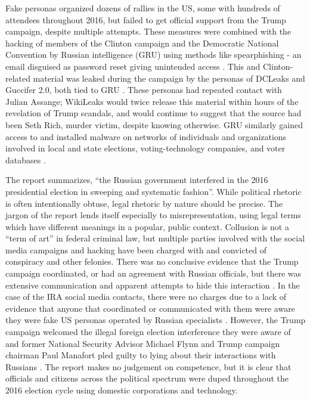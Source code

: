 Fake personas organized dozens of rallies in the US, some with hundreds of attendees throughout 2016, but failed to get official support from the Trump campaign, despite multiple attempts.
These measures were combined with the hacking of members of the Clinton campaign and the Democratic National Convention by Russian intelligence (GRU) using methods like spearphishing - an email disguised as password reset giving unintended access \cite[p.29-37]{mueller}.
This and Clinton-related material was leaked during the campaign by the personas of DCLeaks and Guccifer 2.0, both tied to GRU \cite[p.41]{mueller}.
These personas had repeated contact with Julian Assange; WikiLeaks would twice release this material within hours of the revelation of Trump scandals, and would continue to suggest that the source had been Seth Rich, murder victim, despite knowing otherwise.
GRU similarly gained access to and installed malware on networks of individuals and organizations involved in local and state elections, voting-technology companies, and voter databases \cite[p.46-51]{mueller}.

The report summarizes, ``the Russian government interfered in the 2016 presidential election in sweeping and systematic fashion''.
While political rhetoric is often intentionally obtuse, legal rhetoric by nature should be precise.
The jargon of the report lends itself especially to misrepresentation, using legal terms which have different meanings in a popular, public context.
Collusion is not a ``term of art'' in federal criminal law, but multiple parties involved with the social media campaigns and hacking have been charged with and convicted of conspiracy and other felonies. 
There was no conclusive evidence that the Trump campaign coordinated, or had an agreement with Russian officials, but there was extensive communication and apparent attempts to hide this interaction \cite[p.2-9]{mueller}.
In the case of the IRA social media contacts, there were no charges due to a lack of evidence that anyone that coordinated or communicated with them were aware they were fake US personas operated by Russian specialists \cite[p.35]{mueller}.
However, the Trump campaign welcomed the illegal foreign election interference they were aware of and former National Security Advisor Michael Flynn and Trump campaign chairman Paul Manafort pled guilty to lying about their interactions with Russians \cite[p.9-10]{mueller}.
The report makes no judgement on competence, but it is clear that officials and citizens across the political spectrum were duped throughout the 2016 election cycle using domestic corporations and technology.

